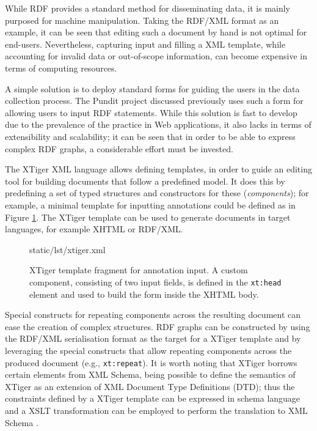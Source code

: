 While RDF provides a standard method for disseminating data, it is mainly
purposed for machine manipulation. Taking the RDF/XML format as an example, it
can be seen that editing such a document by hand is not optimal for end-users.
Nevertheless, capturing input and filling a XML template, while accounting
for invalid data or out-of-scope information, can become expensive in terms of
computing resources.

A simple solution is to deploy standard forms for guiding the users in the data
collection process. The Pundit project discussed previously uses such a form
for allowing users to input RDF statements. While this solution is fast to
develop due to the prevalence of the practice in Web applications, it also
lacks in terms of extensibility and scalability; it can be seen that in order
to be able to express complex RDF graphs, a considerable effort must be
invested.

The XTiger \cite{ref:xtiger} XML language allows defining templates, in order
to guide an editing tool for building documents that follow a predefined model.
It does this by predefining a set of typed structures and constructors for
these (\textit{components}); for example, a minimal template for inputting
annotations could be defined as in Figure \ref{lst:xtiger}. The XTiger template
can be used to generate documents in target languages, for example XHTML or
RDF/XML.

\begin{figure}[!ht]
  
    {static/lst/xtiger.xml}
  \caption[XTiger template fragment for annotation input]
            {XTiger template fragment for annotation input. A custom component,
             consisting of two input fields, is defined in the \texttt{xt:head}
             element and used to build the form inside the XHTML body.}
  \label{lst:xtiger}
\end{figure}

Special constructs for repeating components across the resulting document can
ease the creation of complex structures. RDF graphs can be constructed by using
the RDF/XML serialisation format as the target for a XTiger template and by
leveraging the special constructs that allow repeating components across the
produced document (e.g., \texttt{xt:repeat}). It is worth noting that XTiger
borrows certain elements from XML Schema, being possible to define the
semantics of XTiger as an extension of XML Document Type Definitions (DTD);
thus the constraints defined by a XTiger template can be expressed in schema
language and a XSLT transformation can be employed to perform the translation
to XML Schema \cite{ref:quint}.


